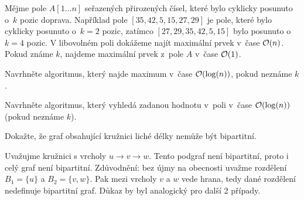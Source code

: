 \documentclass{ib002}
\begin{document}
\newpage
{}
Mějme pole $A[1 \dots n]$ seřazených přirozených čísel, které bylo cyklicky
posunuto o~$k$ pozic doprava. Například pole $[35, 42, 5, 15, 27, 29]$ je pole,
které bylo cyklicky posunuto o~$k = 2$ pozic, zatímco $[27, 29, 35, 42, 5, 15]$
bylo posunuto o~$k = 4$ pozic. V libovolném poli dokážeme najít maximální prvek
v~čase $\mathcal{O}(n)$. Pokud známe $k$, najdeme maximální prvek z~pole $A$ v~čase
$\mathcal{O}(1)$.
\begin{compactenum}
	\item Navrhněte algoritmus, který najde maximum v~čase $\mathcal{O}(\log(n))$,
		pokud neznáme $k$.
	\item Navrhněte algoritmus, který vyhledá zadanou hodnotu v~poli v~čase
		$\mathcal{O}(\log(n))$ (pokud neznáme $k$).
\end{compactenum}

\newpage
{}
Dokažte, že graf obsahující kružnici liché délky nemůže být bipartitní.

Uvažujme kružnici s vrcholy $u \rightarrow v \rightarrow w$. Tento podgraf není
bipartitní, proto i celý graf není bipartitní. Zdůvodnění: bez újmy na
obecnosti uvažme rozdělení $B_1 = \{u\}$ a $B_2 = \{v, w\}$. Pak mezi vrcholy
$v$ a $w$ vede hrana, tedy dané rozdělení nedefinuje bipartitní graf. Důkaz
by byl analogický pro další 2 případy.



\end{document}
